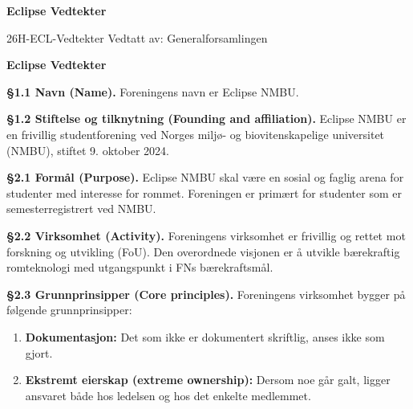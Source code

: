 \documentclass{../../../Common/Latex/Templates/rapport}
\begin{document}
\reportmainmatter
\begingroup
\small
\setlength{\parindent}{0pt}
\setlength{\tabcolsep}{6pt}
\renewcommand{\arraystretch}{1.2}

\begin{center}
  {\Large\bfseries Eclipse Vedtekter}\par
  \vspace{0.15cm}
  {\normalsize 26H-ECL-Vedtekter \textperiodcentered{} \textperiodcentered{} Vedtatt av: Generalforsamlingen}\par
\end{center}

\newpage
\begin{center}
  {\Large\bfseries Eclipse Vedtekter}\par
\end{center}
\tableofcontents

\linenumbers


\label{bylaw:1}
\textbf{\S 1.1 Navn (Name).}\label{bylaw:1.1} Foreningens navn er Eclipse NMBU.

\textbf{\S 1.2 Stiftelse og tilknytning (Founding and affiliation).}\label{bylaw:1.2} Eclipse NMBU er en frivillig studentforening ved Norges miljø- og biovitenskapelige universitet (NMBU), stiftet 9. oktober 2024.

\label{bylaw:2}
\textbf{\S 2.1 Formål (Purpose).}\label{bylaw:2.1} Eclipse NMBU skal være en sosial og faglig arena for studenter med interesse for rommet. Foreningen er primært for studenter som er semesterregistrert ved NMBU.

\textbf{\S 2.2 Virksomhet (Activity).}\label{bylaw:2.2} Foreningens virksomhet er frivillig og rettet mot forskning og utvikling (FoU). Den overordnede visjonen er å utvikle bærekraftig romteknologi med utgangspunkt i FNs bærekraftsmål.

\textbf{\S 2.3 Grunnprinsipper (Core principles).}\label{bylaw:2.3} Foreningens virksomhet bygger på følgende grunnprinsipper:
\begin{enumerate}
  \item \textbf{Dokumentasjon:} Det som ikke er dokumentert skriftlig, anses ikke som gjort.
  \item \textbf{Ekstremt eierskap (extreme ownership):} Dersom noe går galt, ligger ansvaret både hos ledelsen og hos det enkelte medlemmet.
\end{enumerate}
\end{document}
